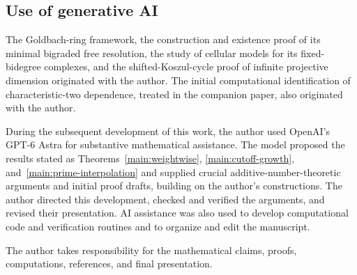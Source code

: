 \subsection*{Use of generative AI}
The Goldbach-ring framework, the construction and existence proof of its
minimal bigraded free resolution, the study of cellular models for its
fixed-bidegree complexes, and the shifted-Koszul-cycle proof of
infinite projective dimension originated with the author. The initial
computational identification of characteristic-two dependence, treated
in the companion paper, also originated with the author.

During the subsequent development of this work, the author used OpenAI's
GPT-6 Astra for substantive mathematical assistance. The model proposed
the results stated as Theorems~\ref{main:weightwise},
\ref{main:cutoff-growth}, and~\ref{main:prime-interpolation} and supplied
crucial additive-number-theoretic arguments and initial proof drafts,
building on the author's constructions. The author directed this
development, checked and verified the arguments, and revised their
presentation. AI assistance was also used to develop computational code
and verification routines and to organize and edit the manuscript.

The author takes responsibility for the mathematical claims, proofs,
computations, references, and final presentation.
